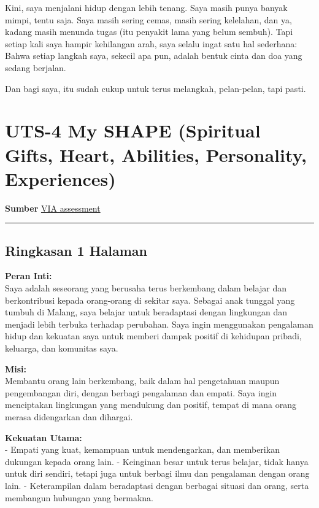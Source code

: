 \documentclass[
  letterpaper,
  DIV=11,
  numbers=noendperiod]{scrreprt}
\begin{document}
Kini, saya menjalani hidup dengan lebih tenang. Saya masih punya banyak
mimpi, tentu saja. Saya masih sering cemas, masih sering kelelahan, dan
ya, kadang masih menunda tugas (itu penyakit lama yang belum sembuh).
Tapi setiap kali saya hampir kehilangan arah, saya selalu ingat satu hal
sederhana: Bahwa setiap langkah saya, sekecil apa pun, adalah bentuk
cinta dan doa yang sedang berjalan.

Dan bagi saya, itu sudah cukup untuk terus melangkah, pelan-pelan, tapi
pasti.


\chapter{UTS-4 My SHAPE (Spiritual Gifts, Heart, Abilities, Personality,
Experiences)}\label{uts-4-my-shape-spiritual-gifts-heart-abilities-personality-experiences}

\textbf{Sumber} \href{StrengthsProfile-Tiara-Kusuma.pdf}{VIA assessment}

\begin{center}\rule{0.5\linewidth}{0.5pt}\end{center}

\section{Ringkasan 1 Halaman}\label{ringkasan-1-halaman}

\textbf{Peran Inti:}\\
Saya adalah seseorang yang berusaha terus berkembang dalam belajar dan
berkontribusi kepada orang-orang di sekitar saya. Sebagai anak tunggal
yang tumbuh di Malang, saya belajar untuk beradaptasi dengan lingkungan
dan menjadi lebih terbuka terhadap perubahan. Saya ingin menggunakan
pengalaman hidup dan kekuatan saya untuk memberi dampak positif di
kehidupan pribadi, keluarga, dan komunitas saya.

\textbf{Misi:}\\
Membantu orang lain berkembang, baik dalam hal pengetahuan maupun
pengembangan diri, dengan berbagi pengalaman dan empati. Saya ingin
menciptakan lingkungan yang mendukung dan positif, tempat di mana orang
merasa didengarkan dan dihargai.

\textbf{Kekuatan Utama:}\\
- Empati yang kuat, kemampuan untuk mendengarkan, dan memberikan
dukungan kepada orang lain. - Keinginan besar untuk terus belajar, tidak
hanya untuk diri sendiri, tetapi juga untuk berbagi ilmu dan pengalaman
dengan orang lain. - Keterampilan dalam beradaptasi dengan berbagai
situasi dan orang, serta membangun hubungan yang bermakna.
\end{document}
